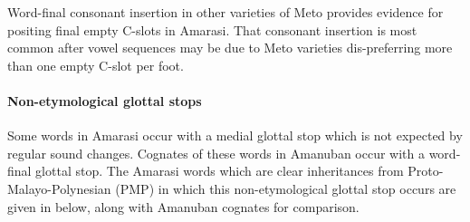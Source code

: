\begin{exe}
	\label{ex:TimConIns2}
\end{exe}

Word-final consonant insertion in other varieties of
Meto provides evidence for positing final empty C-slots
in Amarasi. That consonant insertion is most common
after vowel sequences may be due to Meto varieties
dis-preferring more than one empty C-slot per foot.

\paragraph{Non-etymological glottal stops}\label{sec:NonEtyGloSto}
Some words in Amarasi occur with a medial glottal stop
which is not expected by regular sound changes.
Cognates of these words in Amanuban occur with a word-final glottal stop.
The Amarasi words which are clear inheritances from
Proto-Malayo-Polynesian (PMP) in which this non-etymological
glottal stop occurs are given in  below,
along with Amanuban cognates for comparison.

\begin{exe}
	\label{ex:NonEtyGloSto}
\end{exe}

